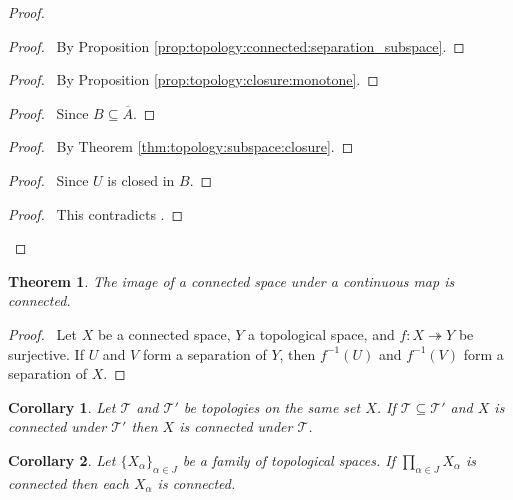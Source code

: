 \documentclass{report}
\let\qed\relax
\newtheorem{thm}[lm]{Theorem}
\newtheorem{cor}{Corollary}[lm]
\theoremstyle{definition}
\begin{document}
  \begin{proof}
    \pf
    \begin{proof}
      \pf\ By Proposition \ref{prop:topology:connected:separation_subspace}.
    \end{proof}
    \begin{proof}
      \pf\ By Proposition \ref{prop:topology:closure:monotone}.
    \end{proof}
    \begin{proof}
      \pf\ Since $B \subseteq \overline{A}$.
    \end{proof}
    \begin{proof}
      \pf\ By Theorem \ref{thm:topology:subspace:closure}.
    \end{proof}
    \begin{proof}
      \pf\ Since $U$ is closed in $B$.
    \end{proof}
    \qedstep
    \begin{proof}
      \pf\ This contradicts .
    \end{proof}
    \qed
  \end{proof}

  \begin{thm}
    \label{thm:topology:connected:image}
    The image of a connected space under a continuous map is connected.
  \end{thm}

  \begin{proof}
    \pf\ Let $X$ be a connected space, $Y$ a topological space, and $f :
    X \twoheadrightarrow Y$ be surjective. If $U$ and $V$ form a separation
    of $Y$, then $f^{-1}(U)$ and $f^{-1}(V)$ form a separation of $X$. \qed
  \end{proof}

  \begin{cor}
    \label{cor:topology:connected:finer}
    Let $\mathcal{T}$ and $\mathcal{T}'$ be topologies on the same set $X$. If
    $\mathcal{T} \subseteq \mathcal{T}'$ and $X$ is connected under
    $\mathcal{T}'$ then $X$ is connected under $\mathcal{T}$.
  \end{cor}

  \begin{cor}
    Let $\{ X_\alpha \}_{\alpha \in J}$ be a family of topological spaces. If
    $\prod_{\alpha \in J} X_\alpha$ is connected then each $X_\alpha$ is
connected.
  \end{cor}
\end{document}
